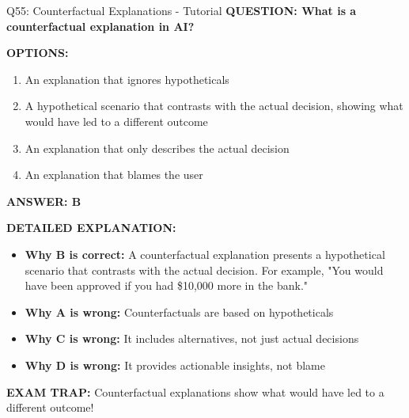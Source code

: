 \documentclass[8pt]{beamer}
\begin{document}
	\begin{frame}{Q55: Counterfactual Explanations - Tutorial}
		\fontsize{6.5}{7.5}\selectfont
		\textbf{QUESTION: What is a counterfactual explanation in AI?}
		
		\vspace{0.1cm}
		\textbf{OPTIONS:}
		\begin{enumerate}
			\item An explanation that ignores hypotheticals
			\item A hypothetical scenario that contrasts with the actual decision, showing what would have led to a different outcome
			\item An explanation that only describes the actual decision
			\item An explanation that blames the user
		\end{enumerate}
		
		\vspace{0.1cm}
		\textcolor{myblue}{\textbf{ANSWER: B}}
		
		\vspace{0.1cm}
		\textbf{DETAILED EXPLANATION:}
		\begin{itemize}
			\item \textbf{Why B is correct:} A counterfactual explanation presents a hypothetical scenario that contrasts with the actual decision. For example, "You would have been approved if you had \$10,000 more in the bank."
			\item \textbf{Why A is wrong:} Counterfactuals are based on hypotheticals
			\item \textbf{Why C is wrong:} It includes alternatives, not just actual decisions
			\item \textbf{Why D is wrong:} It provides actionable insights, not blame
		\end{itemize}
		
		\textcolor{myred}{\textbf{EXAM TRAP:}} Counterfactual explanations show \textcolor{myblue}{what would have led to a different outcome}!
	\end{frame}
	
	
\end{document}
